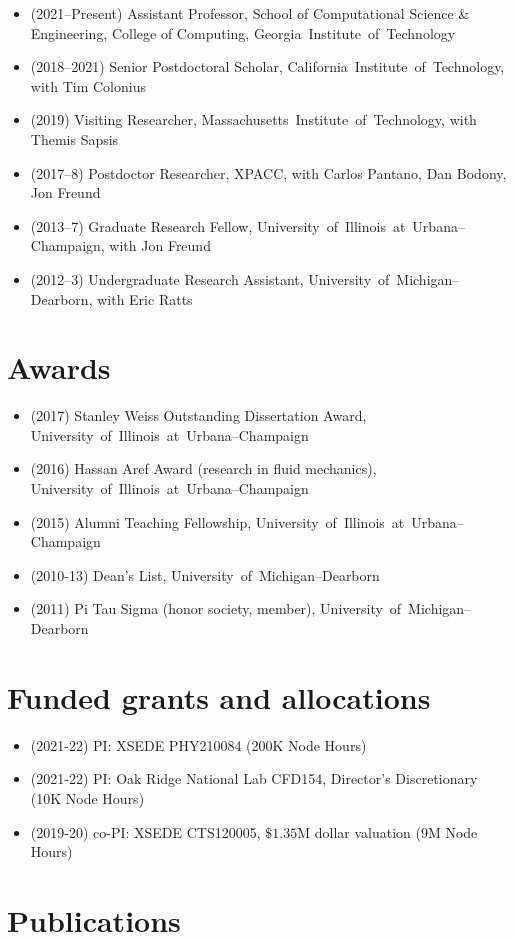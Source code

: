 \documentclass{article}
\newcommand\GIT{\mbox{Georgia Institute of Technology}\xspace}
\newcommand\CIT{\mbox{California Institute of Technology}\xspace}
\newcommand\MIT{\mbox{Massachusetts Institute of Technology}\xspace}
\newcommand\UIUC{\mbox{University of Illinois at Urbana--Champaign}\xspace}
\newcommand\UMD{\mbox{University of Michigan--Dearborn}\xspace}
\begin{document}
\begin{itemize}
    \item (2021--Present) Assistant Professor, School of Computational Science \& Engineering, College of Computing, \GIT
    \item (2018--2021) Senior Postdoctoral Scholar, \CIT, with Tim Colonius
    \item (2019) Visiting Researcher, \MIT, with Themis Sapsis
    \item (2017--8) Postdoctor Researcher, XPACC, with Carlos Pantano, Dan Bodony, Jon Freund
    \item (2013--7) Graduate Research Fellow, \UIUC, with Jon Freund
    \item (2012--3) Undergraduate Research Assistant, \UMD, with Eric Ratts
\end{itemize}

\section{Awards}

\begin{itemize}
    \item (2017) Stanley Weiss Outstanding Dissertation Award, \UIUC
    \item (2016) Hassan Aref Award (research in fluid mechanics), \UIUC
    \item (2015) Alumni Teaching Fellowship, \UIUC
    \item (2010-13) Dean's List, \UMD
    \item (2011) Pi Tau Sigma (honor society, member), \UMD
\end{itemize}

\section{Funded grants and allocations}

\begin{itemize}
    \item (2021-22) PI: XSEDE PHY210084 (200K Node Hours)
    \item (2021-22) PI: Oak Ridge National Lab CFD154, Director's Discretionary (10K Node Hours)
    \item (2019-20) co-PI: XSEDE CTS120005, $\$1.35$M dollar valuation (9M Node Hours)
\end{itemize}


\section{Publications}
\end{document}
